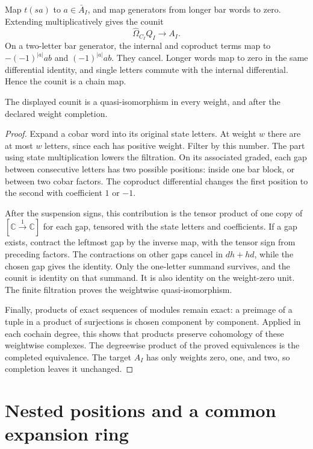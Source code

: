 Map $t(sa)$ to $a\in\bar A_I$, and map generators from longer
bar words to zero. Extending multiplicatively gives the counit
\[
 \widehat\Omega_{C_I}Q_I\longrightarrow A_I.
\]
On a two-letter bar generator, the internal and coproduct terms
map to $-(-1)^{|a|}ab$ and $(-1)^{|a|}ab$.
They cancel. Longer words map to zero in the same differential
identity, and single letters commute with the internal
differential. Hence the counit is a chain map.

\begin{theorem}\label{thm:ocb-reconstruction}
The displayed counit is a quasi-isomorphism in every weight,
and after the declared weight completion.
\end{theorem}

\begin{proof}
Expand a cobar word into its original state letters.
At weight $w$ there are at most $w$ letters, since each has
positive weight. Filter by this number.
The part using state multiplication lowers the filtration.
On its associated graded, each gap between consecutive letters
has two possible positions: inside one bar block, or between two
cobar factors.
The coproduct differential changes the first position to the
second with coefficient $1$ or $-1$.

After the suspension signs, this contribution is the tensor
product of one copy of $[\mathbb C\xrightarrow{1}\mathbb C]$
for each gap, tensored with the state letters and coefficients.
If a gap exists, contract the leftmost gap by the inverse map,
with the tensor sign from preceding factors.
The contractions on other gaps cancel in $dh+hd$, while the
chosen gap gives the identity.
Only the one-letter summand survives, and the counit is identity
on that summand. It is also identity on the weight-zero unit.
The finite filtration proves the weightwise quasi-isomorphism.

Finally, products of exact sequences of modules remain exact:
a preimage of a tuple in a product of surjections is chosen
component by component.
Applied in each cochain degree, this shows that products preserve
cohomology of these weightwise complexes.
The degreewise product of the proved equivalences is the completed
equivalence. The target $A_I$ has only weights zero, one, and
two, so completion leaves it unchanged.
\end{proof}

\section{Nested positions and a common expansion ring}

